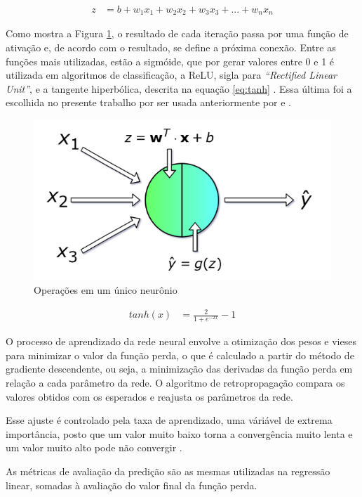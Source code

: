 \documentclass[brazil,tf,epusp]{usp}  %
\begin{document}
\begin{align}
  z &= b + {w}_1 {x}_1 + {w}_2 {x}_2 + {w}_3 {x}_3 + ... + {w}_n {x}_n \label{eq:single-neuron}
\end{align}

Como mostra a Figura \ref{fig:single-neuron}, o resultado de cada iteração passa por uma função de ativação e, de acordo com o resultado, se define a próxima conexão. Entre as funções mais utilizadas, estão a sigmóide, que por gerar valores entre 0 e 1 é utilizada em algoritmos de classificação, a ReLU, sigla para \textit{``Rectified Linear Unit''}, e a tangente hiperbólica, descrita na equação \ref{eq:tanh} \cite{Skalski2017}. Essa última foi a escolhida no presente trabalho por ser usada anteriormente por  e .

\begin{figure}[ht!]
  \includegraphics[width=.7\textwidth]{img/single-neuron.png}
  \caption{Operações em um único neurônio \cite{Skalski2017}}
  \label{fig:single-neuron}
\end{figure}

\begin{align}
  tanh (x) &= \frac{2}{1 + e^{-2x}} - 1
  \label{eq:tanh}
\end{align}

O processo de aprendizado da rede neural envolve a otimização dos pesos e vieses para minimizar o valor da função perda, o que é calculado a partir do método de gradiente descendente, ou seja, a minimização das derivadas da função perda em relação a cada parâmetro da rede. O algoritmo de retropropagação compara os valores obtidos com os esperados e reajusta os parâmetros da rede.

Esse ajuste é controlado pela taxa de aprendizado, uma váriável de extrema importância, posto que um valor muito baixo torna a convergência muito lenta e um valor muito alto pode não convergir \cite{Skalski2017}.

As métricas de avaliação da predição são as mesmas utilizadas na regressão linear, somadas à avaliação do valor final da função perda.
\end{document}
